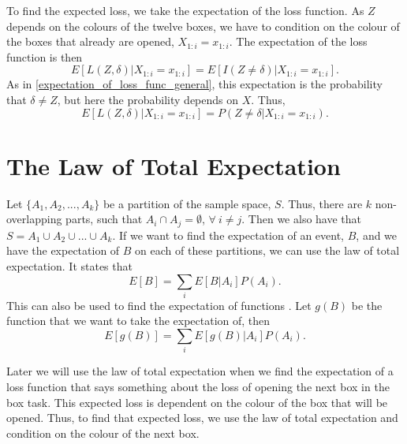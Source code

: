 To find the expected loss, we take the expectation of the loss function. As $Z$ depends on the colours of the twelve boxes, we have to condition on the colour of the boxes that already are opened, $ X_{1:i}=x_{1:i}$. The expectation of the loss function is then
\begin{equation*}
    E[L(Z,\delta)|X_{1:i}=x_{1:i}] = E[I(Z\neq \delta)|X_{1:i}=x_{1:i}].
\end{equation*}
As in \eqref{expectation_of_loss_func_general}, this expectation is the probability that $\delta \neq Z$, but here the probability depends on $X$. Thus,
\begin{equation}
\label{exp_loss_theory}
    E[L(Z,\delta)|X_{1:i}=x_{1:i}] = P(Z\neq \delta|X_{1:i}=x_{1:i}).
\end{equation}








\section{The Law of Total Expectation}
Let $\{A_1,A_2,...,A_k\}$ be a partition of the sample space, $S$. Thus, there are $k$ non-overlapping parts, such that $A_i \cap A_j = \emptyset$, $\forall \:
i \neq j$. Then we also have that $S = A_1 \cup A_2 \cup...\cup A_k$. If we want to find the expectation of an event, $B$, and we have the expectation of $B$ on each of these partitions, we can use the law of total expectation. It states that
\begin{equation}
    E[B] = \sum_i E[B|A_i]P(A_i).
\end{equation}
This can also be used to find the expectation of functions \citep{schay2016introduction}. Let $g(B)$ be the function that we want to take the expectation of, then
\begin{equation}
\label{law_tot_exp_func}
    E[g(B)] = \sum_i E[g(B)|A_i]P(A_i).
\end{equation}

Later we will use the law of total expectation when we find the expectation of a loss function that says something about the loss of opening the next box in the box task. This expected loss is dependent on the colour of the box that will be opened. Thus, to find that expected loss, we use the law of total expectation and condition on the colour of the next box. 

